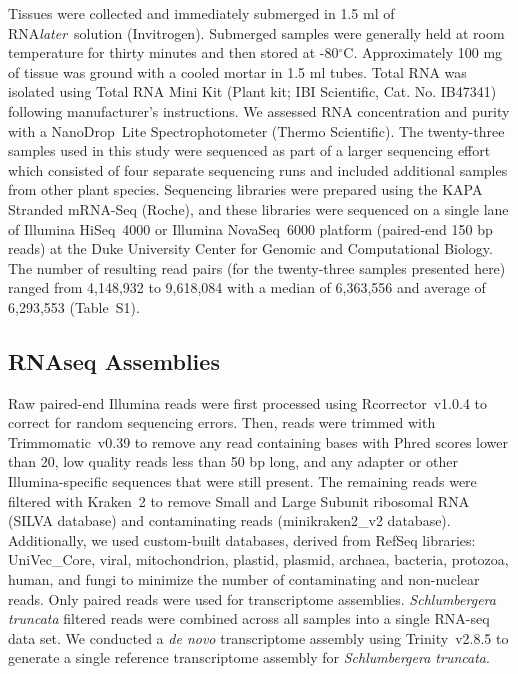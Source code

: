 \documentclass[11pt,letterpaper,titlepage]{article}
\begin{document}
\begin{linenumbers}
Tissues were collected and immediately submerged in 1.5 ml of RNA\textit{later}\texttrademark~solution (Invitrogen).
Submerged samples were generally held at room temperature for thirty minutes and then stored at -80$^{\circ}$C.
Approximately 100 mg of tissue was ground with a cooled mortar in 1.5 ml tubes.
Total RNA was isolated using Total RNA Mini Kit (Plant kit; IBI Scientific, Cat. No. IB47341) following manufacturer's instructions.
We assessed RNA concentration and purity with a NanoDrop\texttrademark~Lite Spectrophotometer (Thermo Scientific).
The twenty-three samples used in this study were sequenced as part of a larger sequencing effort which consisted of four separate sequencing runs and included additional samples from other plant species.
Sequencing libraries were prepared using the KAPA Stranded mRNA-Seq (Roche), and these libraries were sequenced on a single lane of Illumina \mbox{HiSeq}~4000 or Illumina \mbox{NovaSeq}~6000 platform (paired-end 150 bp reads) at the Duke University Center for Genomic and Computational Biology.
The number of resulting read pairs (for the twenty-three samples presented here) ranged from 4,148,932 to 9,618,084 with a median of 6,363,556 and average of 6,293,553 (Table~S1).

\subsection*{RNAseq Assemblies}

Raw paired-end Illumina reads were first processed using \mbox{Rcorrector}~v1.0.4 
 to correct for random sequencing errors.
Then, reads were trimmed with \mbox{Trimmomatic}~v0.39 
 to remove any read containing bases with Phred scores lower than 20, low quality reads less than 50 bp long, and any adapter or other Illumina-specific sequences that were still present.
The remaining reads were filtered with \mbox{Kraken}~2 
 to remove Small and Large Subunit ribosomal RNA (SILVA database) 
 and contaminating reads (minikraken2\_v2 database).
Additionally, we used custom-built databases, derived from RefSeq libraries: UniVec\_Core, viral, mitochondrion, plastid, plasmid, archaea, bacteria, protozoa, human, and fungi to minimize the number of contaminating and non-nuclear reads.
Only paired reads were used for transcriptome assemblies.
\textit{Schlumbergera truncata} filtered reads were combined across all samples into a single RNA-seq data set.
We conducted a \textit{de novo} transcriptome assembly using \mbox{Trinity}~v2.8.5 
to generate a single reference transcriptome assembly for \textit{Schlumbergera truncata}.


\end{linenumbers}
\end{document}
